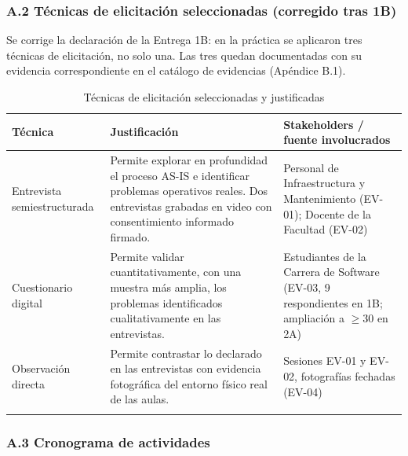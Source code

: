 \subsubsection*{A.2 Técnicas de elicitación seleccionadas (corregido tras 1B)}


Se corrige la declaración de la Entrega 1B: en la práctica se aplicaron tres técnicas de elicitación, no solo una. Las tres quedan documentadas con su evidencia correspondiente en el catálogo de evidencias (Apéndice B.1).


\begingroup
\small
\begin{longtable}{|P{0.3333}|P{0.3333}|P{0.3333}|}
\hline
Técnica & Justificación & Stakeholders / fuente involucrados \\ \hline
Entrevista semiestructurada & Permite explorar en profundidad el proceso AS-IS e identificar problemas operativos reales. Dos entrevistas grabadas en video con consentimiento informado firmado. & Personal de Infraestructura y Mantenimiento (EV-01); Docente de la Facultad (EV-02) \\ \hline
Cuestionario digital & Permite validar cuantitativamente, con una muestra más amplia, los problemas identificados cualitativamente en las entrevistas. & Estudiantes de la Carrera de Software (EV-03, 9 respondientes en 1B; ampliación a $\geq$30 en 2A) \\ \hline
Observación directa & Permite contrastar lo declarado en las entrevistas con evidencia fotográfica del entorno físico real de las aulas. & Sesiones EV-01 y EV-02, fotografías fechadas (EV-04) \\ \hline
\caption{Técnicas de elicitación seleccionadas y justificadas}
\end{longtable}
\endgroup

\subsubsection*{A.3 Cronograma de actividades}


